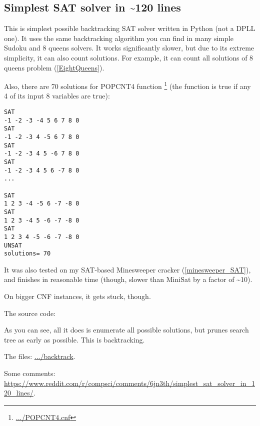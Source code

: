 \subsection{Simplest SAT solver in \textasciitilde{}120 lines}
\label{SAT_backtrack}

\renewcommand{\CURPATH}{solvers/backtrack}

This is simplest possible backtracking SAT solver written in Python (not a \ac{DPLL} one).
It uses the same backtracking algorithm you can find in many simple Sudoku and 8 queens solvers.
It works significantly slower, but due to its extreme simplicity, it can also count solutions.
For example, it can count all solutions of 8 queens problem (\ref{EightQueens}).

Also, there are 70 solutions for POPCNT4 function
\footnote{\url{.../POPCNT4.cnf}}
(the function is true if any 4 of its input 8 variables are true):

\begin{lstlisting}
SAT
-1 -2 -3 -4 5 6 7 8 0
SAT
-1 -2 -3 4 -5 6 7 8 0
SAT
-1 -2 -3 4 5 -6 7 8 0
SAT
-1 -2 -3 4 5 6 -7 8 0
...

SAT
1 2 3 -4 -5 6 -7 -8 0
SAT
1 2 3 -4 5 -6 -7 -8 0
SAT
1 2 3 4 -5 -6 -7 -8 0
UNSAT
solutions= 70
\end{lstlisting}

It was also tested on my SAT-based Minesweeper cracker (\ref{minesweeper_SAT}),
and finishes in reasonable time (though, slower than MiniSat by a factor of \textasciitilde{}10).

On bigger \ac{CNF} instances, it gets stuck, though.

The source code:



As you can see, all it does is enumerate all possible solutions, but prunes search tree as early as possible.
This is backtracking.

The files: \url{.../backtrack}.

Some comments: \url{https://www.reddit.com/r/compsci/comments/6jn3th/simplest_sat_solver_in_120_lines/}.

